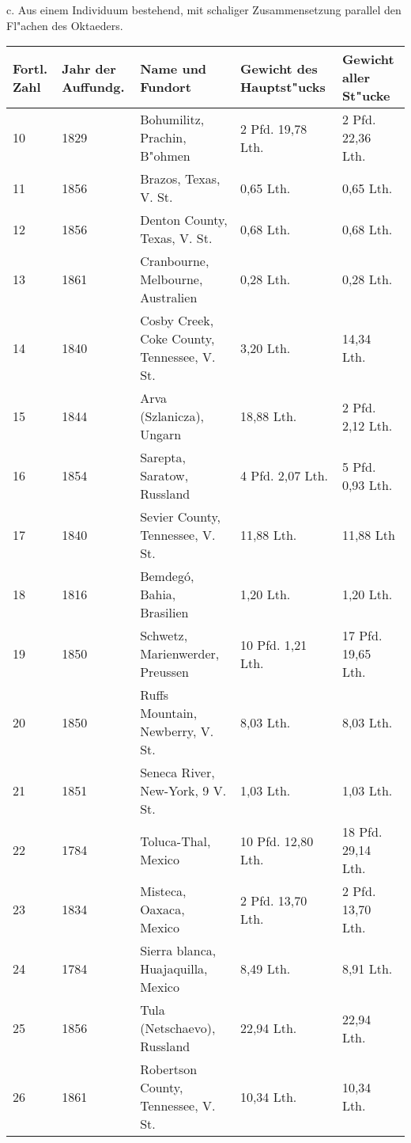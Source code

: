 \documentclass[a4paper, 11pt, oneside, german]{article}
\begin{document}
\clearpage
\begin{center}
c. Aus einem Individuum bestehend, mit schaliger Zusammensetzung parallel den Fl"achen des Oktaeders.
\end{center}
\begin{center}
\begin{footnotesize}
\begin{tabular}{ |p{7mm}|p{9mm}|p{45mm}|p{24mm}|p{24mm}| }
    \hline
    Fortl. Zahl & Jahr der Auffundg. & Name und Fundort & Gewicht des Hauptst"ucks & Gewicht aller St"ucke\\
    \hline\hline
    10 & 1829 & Bohumilitz, Prachin, B"ohmen & 2 Pfd. 19,78 Lth. & 2 Pfd. 22,36 Lth.\\\hline
    11 & 1856 & Brazos, Texas, V. St. & 0,65 Lth. & 0,65 Lth.\\\hline
    12 & 1856 & Denton County, Texas, V. St. & 0,68 Lth. & 0,68 Lth.\\\hline
    13 & 1861 & Cranbourne, Melbourne, Australien & 0,28 Lth. & 0,28 Lth.\\\hline
    14 & 1840 & Cosby Creek, Coke County, Tennessee, V. St. & 3,20 Lth. & 14,34 Lth.\\\hline
    15 & 1844 & Arva (Szlanicza), Ungarn & 18,88 Lth. & 2 Pfd. 2,12 Lth.\\\hline
    16 & 1854 & Sarepta, Saratow, Russland & 4 Pfd. 2,07 Lth. & 5 Pfd. 0,93 Lth.\\\hline
    17 & 1840 & Sevier County, Tennessee, V. St. & 11,88 Lth. & 11,88 Lth\\\hline
    18 & 1816 & Bemdegó, Bahia, Brasilien & 1,20 Lth. & 1,20 Lth.\\\hline
    19 & 1850 & Schwetz, Marienwerder, Preussen & 10 Pfd. 1,21 Lth. & 17 Pfd. 19,65 Lth.\\\hline
    20 & 1850 & Ruffs Mountain, Newberry, V. St. & 8,03 Lth. & 8,03 Lth.\\\hline
    21 & 1851 & Seneca River, New-York, 9 V. St. & 1,03 Lth. & 1,03 Lth.\\\hline
    22 & 1784 & Toluca-Thal, Mexico & 10 Pfd. 12,80 Lth. & 18 Pfd. 29,14 Lth.\\\hline
    23 & 1834 & Misteca, Oaxaca, Mexico & 2 Pfd. 13,70 Lth. & 2 Pfd. 13,70 Lth.\\\hline
    24 & 1784 & Sierra blanca, Huajaquilla, Mexico & 8,49 Lth. & 8,91 Lth.\\\hline
    25 & 1856 & Tula (Netschaevo), Russland & 22,94 Lth. & 22,94 Lth.\\\hline
    26 & 1861 & Robertson County, Tennessee, V. St. & 10,34 Lth. & 10,34 Lth.\\\hline

\end{tabular}
\end{footnotesize}
\end{center}
\end{document}

